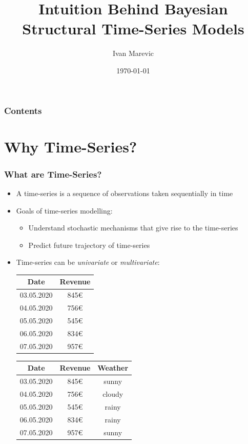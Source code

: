 \documentclass{beamer}
\begin{document}
\title{Intuition Behind Bayesian Structural Time-Series Models}   
\author{Ivan Marevic} 
\date{\today}

\begin{frame}
\titlepage
\end{frame}

\begin{frame}
\frametitle{Contents}\tableofcontents
\end{frame}


\section{Why Time-Series?} 
\begin{frame}[t]\frametitle{What are Time-Series?}
\begin{itemize}
\item A time-series is a sequence of observations taken sequentially in time
\item Goals of time-series modelling:
	\begin{itemize} 
	\item Understand stochastic mechanisms that give rise to the time-series
	\item Predict future trajectory of time-series
	\end{itemize}
\item Time-series can be \textit{univariate} or \textit{multivariate}:
\bigskip

\begin{tabular}{||c c||} 
 \hline
 Date &  Revenue \\ [0.5ex] 
 \hline\hline
 03.05.2020 & 845\euro \\ 
 \hline
 04.05.2020 & 756\euro \\
 \hline
 05.05.2020 & 545\euro \\
 \hline
 06.05.2020 & 834\euro \\
 \hline
 07.05.2020 & 957\euro \\
 \hline
\end{tabular}
\quad
\begin{tabular}{||c c c||} 
 \hline
 Date & Revenue & Weather \\ [0.5ex] 
 \hline\hline
 03.05.2020 & 845\euro & sunny \\ 
 \hline
 04.05.2020 & 756\euro & cloudy\\
 \hline
 05.05.2020 & 545\euro & rainy\\
 \hline
 06.05.2020 & 834\euro & rainy\\
 \hline
 07.05.2020 & 957\euro & sunny\\
 \hline
\end{tabular}

\end{itemize} 
\end{frame}
\end{document}
